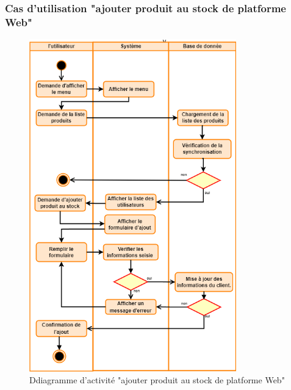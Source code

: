 \documentclass[edit,12pt,a4paper,ChapStyle,oneside,doubleinterligne]{report}
\begin{document}
\subsubsection{Cas d'utilisation "ajouter produit au stock de platforme Web"}
\begin{figure}[h!]\label{fig:activite ajouters}
    \centering
    \includegraphics[width=0.8\textwidth]{images/act ajouter produit au stock.png}
    \caption{Ddiagramme d'activité "ajouter produit au stock de platforme Web"}
\end{figure}

\clearpage
\end{document}
